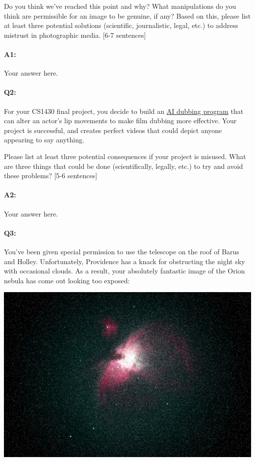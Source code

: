 Do you think we've reached this point and why? What manipulations do you think are permissible for an image to be genuine, if any? Based on this, please list at least three potential solutions (scientific, journalistic, legal, etc.) to address mistrust in photographic media. [6-7 sentences]

\paragraph{A1:} Your answer here.
\pagebreak
\paragraph{Q2:} For your CS1430 final project, you decide to build an \href{https://respeecher.medium.com/what-is-synthetic-film-dubbing-ai-deepfake-technology-explained-9f6118532e8c}{AI dubbing program} that can alter an actor's lip movements to make film dubbing more effective. Your project is successful, and creates perfect videos that could depict anyone appearing to say anything.

Please list at least three potential consequences if your project is misused. What are three things that could be done (scientifically, legally, etc.) to try and avoid these problems? [5-6 sentences]

\paragraph{A2:} Your answer here.
\pagebreak

\paragraph{Q3:} You've been given special permission to use the telescope on the roof of Barus and Holley. Unfortunately, Providence has a knack for obstructing the night sky with occasional clouds. As a result, your absolutely fantastic image of the Orion nebula has come out looking too exposed:

\includegraphics[width=\textwidth * 7/10]{images/orion-noise.png}


